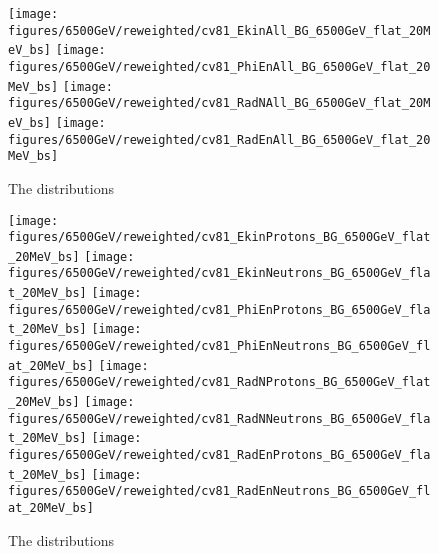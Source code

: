 \begin{figure}
\begin{center}
  \texttt{[image: figures/6500GeV/reweighted/cv81\_EkinAll\_BG\_6500GeV\_flat\_20MeV\_bs]}
  \texttt{[image: figures/6500GeV/reweighted/cv81\_PhiEnAll\_BG\_6500GeV\_flat\_20MeV\_bs]}
  \texttt{[image: figures/6500GeV/reweighted/cv81\_RadNAll\_BG\_6500GeV\_flat\_20MeV\_bs]}
  \texttt{[image: figures/6500GeV/reweighted/cv81\_RadEnAll\_BG\_6500GeV\_flat\_20MeV\_bs]}
\end{center}
\vspace{-0.6cm}
 \caption{The distributions 
  \label{fig:EkinPhiEn6p52}}
\end{figure}



\begin{figure}
\begin{center}
  \texttt{[image: figures/6500GeV/reweighted/cv81\_EkinProtons\_BG\_6500GeV\_flat\_20MeV\_bs]}
  \texttt{[image: figures/6500GeV/reweighted/cv81\_EkinNeutrons\_BG\_6500GeV\_flat\_20MeV\_bs]}
  \texttt{[image: figures/6500GeV/reweighted/cv81\_PhiEnProtons\_BG\_6500GeV\_flat\_20MeV\_bs]}
  \texttt{[image: figures/6500GeV/reweighted/cv81\_PhiEnNeutrons\_BG\_6500GeV\_flat\_20MeV\_bs]}
  \texttt{[image: figures/6500GeV/reweighted/cv81\_RadNProtons\_BG\_6500GeV\_flat\_20MeV\_bs]}
  \texttt{[image: figures/6500GeV/reweighted/cv81\_RadNNeutrons\_BG\_6500GeV\_flat\_20MeV\_bs]}
  \texttt{[image: figures/6500GeV/reweighted/cv81\_RadEnProtons\_BG\_6500GeV\_flat\_20MeV\_bs]}
  \texttt{[image: figures/6500GeV/reweighted/cv81\_RadEnNeutrons\_BG\_6500GeV\_flat\_20MeV\_bs]}
\end{center}
\vspace{-0.6cm}
 \caption{The distributions 
  \label{fig:ProtNeut6p52}} 
\end{figure}

